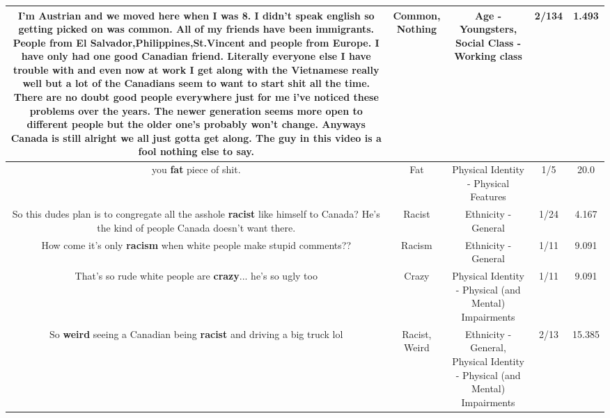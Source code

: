 \documentclass[11pt]{article}
\newlength\mylength
\begin{document}
\begin{center}
\begin{longtable}{|C{.65\mylength}|C{.30\mylength}|C{.12\mylength}|C{.12\mylength}|C{.12\mylength}|}
  \small I'm Austrian and we moved here when I was 8. I didn't speak english so getting picked on was \textbf{common}. All of my friends have been immigrants. People from El Salvador,Philippines,St.Vincent and people from Europe. I have only had one good Canadian friend. Literally everyone else I have trouble with and even now at work I get along with the Vietnamese really well but a lot of the Canadians seem to want to start shit all the time. There are no doubt good people everywhere just for me i've noticed these problems over the years. The newer generation seems more open to different people but the older one's probably won't change. Anyways Canada is still alright we all just gotta get along. The guy in this video is a fool \textbf{nothing} else to say.\normalsize   & Common, Nothing & Age - Youngsters, Social Class - Working class & 2/134 & 1.493 \\  \hline
  \small you \textbf{fat} piece of shit.\normalsize   & Fat & Physical Identity - Physical Features & 1/5 & 20.0 \\  \hline
  \small So this dudes plan is to congregate all the asshole \textbf{racist} like himself to Canada? He's the kind of people Canada doesn't want there.\normalsize   & Racist & Ethnicity - General & 1/24 & 4.167 \\  \hline
  \small How come it's only \textbf{racism} when white people make stupid comments??\normalsize   & Racism & Ethnicity - General & 1/11 & 9.091 \\  \hline
  \small That's so rude white people are \textbf{crazy}... he's so ugly too\normalsize   & Crazy & Physical Identity - Physical (and Mental) Impairments & 1/11 & 9.091 \\  \hline
  \small So \textbf{weird} seeing a Canadian being \textbf{racist} and driving a big truck lol\normalsize   & Racist, Weird & Ethnicity - General, Physical Identity - Physical (and Mental) Impairments & 2/13 & 15.385 \\  \hline

\end{longtable}
\end{center}
\end{document}
